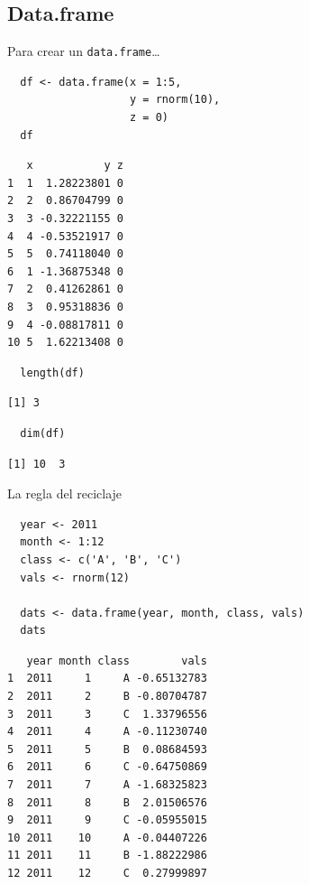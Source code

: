 \documentclass[xcolor={usenames,svgnames,dvipsnames}]{beamer}
\begin{document}
\subsection{Data.frame}
\label{sec-2-4}
\begin{frame}[fragile,label=sec-2-4-1]{Para crear un \texttt{data.frame}\ldots{}}
 \lstset{language=R,label= ,caption= ,numbers=none}
\begin{lstlisting}
  df <- data.frame(x = 1:5,
                   y = rnorm(10),
                   z = 0)
  df
\end{lstlisting}

\begin{verbatim}
   x           y z
1  1  1.28223801 0
2  2  0.86704799 0
3  3 -0.32221155 0
4  4 -0.53521917 0
5  5  0.74118040 0
6  1 -1.36875348 0
7  2  0.41262861 0
8  3  0.95318836 0
9  4 -0.08817811 0
10 5  1.62213408 0
\end{verbatim}

\lstset{language=R,label= ,caption= ,numbers=none}
\begin{lstlisting}
  length(df)
\end{lstlisting}

\begin{verbatim}
[1] 3
\end{verbatim}

\lstset{language=R,label= ,caption= ,numbers=none}
\begin{lstlisting}
  dim(df)
\end{lstlisting}

\begin{verbatim}
[1] 10  3
\end{verbatim}
\end{frame}

\begin{frame}[fragile,label=sec-2-4-2]{La regla del reciclaje}
 \lstset{language=R,label= ,caption= ,numbers=none}
\begin{lstlisting}
  year <- 2011
  month <- 1:12
  class <- c('A', 'B', 'C')
  vals <- rnorm(12)
  
  dats <- data.frame(year, month, class, vals)
  dats
\end{lstlisting}

\begin{verbatim}
   year month class        vals
1  2011     1     A -0.65132783
2  2011     2     B -0.80704787
3  2011     3     C  1.33796556
4  2011     4     A -0.11230740
5  2011     5     B  0.08684593
6  2011     6     C -0.64750869
7  2011     7     A -1.68325823
8  2011     8     B  2.01506576
9  2011     9     C -0.05955015
10 2011    10     A -0.04407226
11 2011    11     B -1.88222986
12 2011    12     C  0.27999897
\end{verbatim}
\end{frame}
\end{document}
